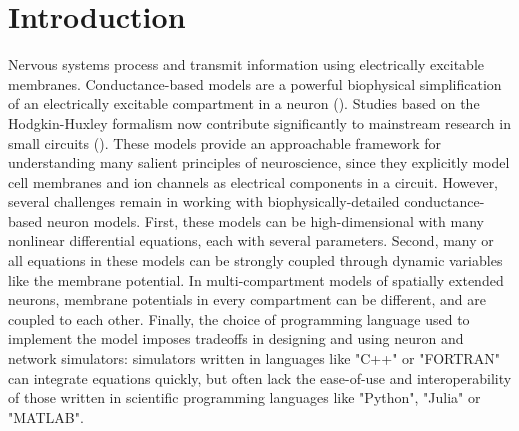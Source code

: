 \documentclass{frontiersSCNS} %
\begin{document}
\section{Introduction}
\label{sec:intro}

Nervous systems process and transmit information using electrically excitable membranes. Conductance-based models are a powerful biophysical simplification of an electrically excitable compartment in a neuron (\cite{hodgkinQuantitativeDescriptionMembrane1952}). Studies based on the Hodgkin-Huxley formalism now contribute significantly to mainstream research in small circuits (\cite{marderTheoryMotion1995, prinzComputationalApproachesNeuronal2010, prinzInsightsModelsRhythmic2006}). These models provide an approachable framework for understanding many salient principles of neuroscience, since they explicitly model cell membranes and ion channels as electrical components in a circuit. However, several challenges remain in working with biophysically-detailed conductance-based neuron models. First, these models can be high-dimensional with many nonlinear differential equations, each with several parameters. Second, many or all equations in these models can be strongly coupled through dynamic variables like the membrane potential.  In multi-compartment models of spatially extended neurons, membrane potentials in every compartment can be different, and are coupled to each other. Finally, the choice of programming language used to implement the model imposes tradeoffs in designing and using neuron and network simulators: simulators written in languages like "C++" or "FORTRAN" can integrate equations quickly, but often lack the ease-of-use and interoperability of those written in scientific programming languages like "Python", "Julia" or "MATLAB".
\end{document}
